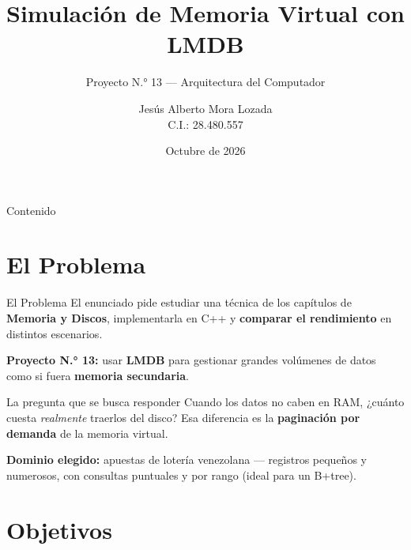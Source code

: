 \documentclass[aspectratio=169,11pt]{beamer}
\title[Memoria Virtual con LMDB]{Simulación de Memoria Virtual con LMDB}
\subtitle{Proyecto N.° 13 --- Arquitectura del Computador}
\author{Jesús Alberto Mora Lozada \\ \small C.I.: 28.480.557}
\institute[UC]{Universidad de Carabobo\\Facultad Experimental de Ciencias y Tecnología}
\date{Octubre de 2026}
\begin{document}
\begin{frame}
  \titlepage
\end{frame}

\begin{frame}{Contenido}
  \tableofcontents
\end{frame}

\section{El Problema}

\begin{frame}{El Problema}
  El enunciado pide estudiar una técnica de los capítulos de
  \textbf{Memoria y Discos}, implementarla en C++ y \textbf{comparar el
  rendimiento} en distintos escenarios.

  \vspace{0.4cm}
  \textbf{Proyecto N.° 13:} usar \textbf{LMDB} para gestionar grandes
  volúmenes de datos como si fuera \textbf{memoria secundaria}.

  \vspace{0.4cm}
  \begin{block}{La pregunta que se busca responder}
    Cuando los datos no caben en RAM, ¿cuánto cuesta \emph{realmente}
    traerlos del disco? Esa diferencia es la \textbf{paginación por demanda}
    de la memoria virtual.
  \end{block}

  \vspace{0.2cm}
  \textbf{Dominio elegido:} apuestas de lotería venezolana --- registros
  pequeños y numerosos, con consultas puntuales y por rango (ideal para un
  B+tree).
\end{frame}

\section{Objetivos}
\end{document}
